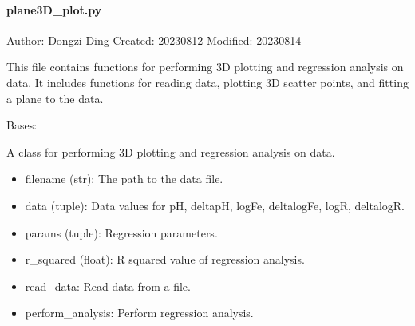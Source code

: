 \documentclass[a4paper,10pt,english]{sphinxmanual}
\begin{document}
\paragraph{plane3D\_plot.py}
\label{\detokenize{utils:plane3d-plot-py}}
\sphinxAtStartPar
Author: Dongzi Ding
Created: 2023\sphinxhyphen{}08\sphinxhyphen{}12
Modified: 2023\sphinxhyphen{}08\sphinxhyphen{}14

\sphinxAtStartPar
This file contains functions for performing 3D plotting and regression analysis on data.
It includes functions for reading data, plotting 3D scatter points, and fitting a plane to the data.

\begin{fulllineitems}
\label{\detokenize{utils:src.utils.plane3D_plot.Plane3DPlotter}}
\pysigstartsignatures
{}
\pysigstopsignatures
\sphinxAtStartPar
Bases: 

\sphinxAtStartPar
A class for performing 3D plotting and regression analysis on data.
\begin{description}
\begin{itemize}
\item {} 
\sphinxAtStartPar
filename (str): The path to the data file.

\item {} 
\sphinxAtStartPar
data (tuple): Data values for pH, deltapH, logFe, deltalogFe, logR, deltalogR.

\item {} 
\sphinxAtStartPar
params (tuple): Regression parameters.

\item {} 
\sphinxAtStartPar
r\_squared (float): R squared value of regression analysis.

\end{itemize}

\begin{itemize}
\item {} 
\sphinxAtStartPar
read\_data: Read data from a file.

\item {} 
\sphinxAtStartPar
perform\_analysis: Perform regression analysis.


\end{itemize}
\end{description}
\end{fulllineitems}
\end{document}
